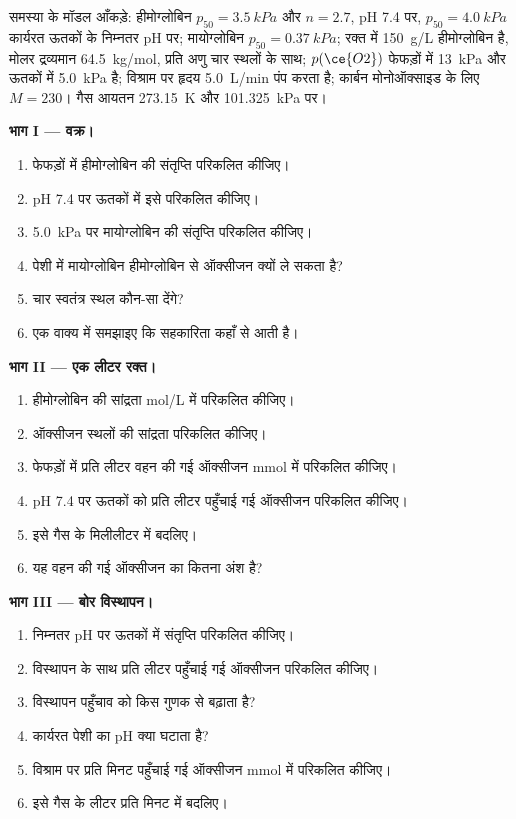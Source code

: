 \begin{problem}
\label{pb:b3:bioinorganic:1}
समस्या के मॉडल आँकड़े: हीमोग्लोबिन $p_{50} = \qty{3.5}{kPa}$ और $n = 2.7$, pH 7.4 पर, $p_{50} = \qty{4.0}{kPa}$
कार्यरत ऊतकों के निम्नतर pH पर; मायोग्लोबिन $p_{50} = \qty{0.37}{kPa}$; रक्त में \qty{150}{g/L}
हीमोग्लोबिन है, मोलर द्रव्यमान \qty{64.5}{kg/mol}, प्रति अणु चार स्थलों के साथ; $p(\ce{O2})$ फेफड़ों में \qty{13}{kPa}
और ऊतकों में \qty{5.0}{kPa} है; विश्राम पर हृदय \qty{5.0}{L/min} पंप करता है;
कार्बन मोनोऑक्साइड के लिए $M = 230$। गैस आयतन \qty{273.15}{K} और \qty{101.325}{kPa} पर।

\medskip\noindent\textbf{भाग I --- वक्र।}
\begin{enumerate}
  \item फेफड़ों में हीमोग्लोबिन की संतृप्ति परिकलित कीजिए।
  \item pH 7.4 पर ऊतकों में इसे परिकलित कीजिए।
  \item \qty{5.0}{kPa} पर मायोग्लोबिन की संतृप्ति परिकलित कीजिए।
  \item पेशी में मायोग्लोबिन हीमोग्लोबिन से ऑक्सीजन क्यों ले सकता है?
  \item चार स्वतंत्र स्थल कौन-सा  देंगे?
  \item एक वाक्य में समझाइए कि सहकारिता कहाँ से आती है।
\end{enumerate}

\medskip\noindent\textbf{भाग II --- एक लीटर रक्त।}
\begin{enumerate}[resume]
  \item हीमोग्लोबिन की सांद्रता mol/L में परिकलित कीजिए।
  \item ऑक्सीजन स्थलों की सांद्रता परिकलित कीजिए।
  \item फेफड़ों में प्रति लीटर वहन की गई ऑक्सीजन mmol में परिकलित कीजिए।
  \item pH 7.4 पर ऊतकों को प्रति लीटर पहुँचाई गई ऑक्सीजन परिकलित कीजिए।
  \item इसे गैस के मिलीलीटर में बदलिए।
  \item यह वहन की गई ऑक्सीजन का कितना अंश है?
\end{enumerate}

\medskip\noindent\textbf{भाग III --- बोर विस्थापन।}
\begin{enumerate}[resume]
  \item निम्नतर pH पर ऊतकों में संतृप्ति परिकलित कीजिए।
  \item विस्थापन के साथ प्रति लीटर पहुँचाई गई ऑक्सीजन परिकलित कीजिए।
  \item विस्थापन पहुँचाव को किस गुणक से बढ़ाता है?
  \item कार्यरत पेशी का pH क्या घटाता है?
  \item विश्राम पर प्रति मिनट पहुँचाई गई ऑक्सीजन mmol में परिकलित कीजिए।
  \item इसे गैस के लीटर प्रति मिनट में बदलिए।
\end{enumerate}


\end{problem}
